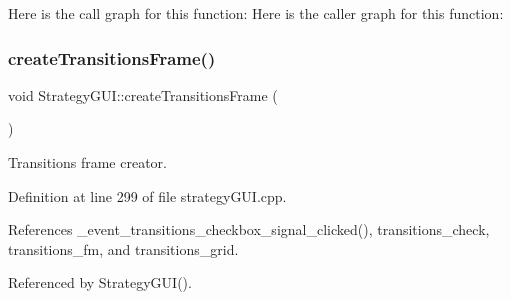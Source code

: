 Here is the call graph for this function\+:
Here is the caller graph for this function\+:
\mbox{\label{class_strategy_g_u_i_ab39aceb2dc4fc8b0b571d9284c463b5a}} 
\subsubsection{\texorpdfstring{create\+Transitions\+Frame()}{createTransitionsFrame()}}
{\footnotesize\ttfamily void Strategy\+G\+U\+I\+::create\+Transitions\+Frame (\begin{DoxyParamCaption}{ }\end{DoxyParamCaption})}



Transitions frame creator. 



Definition at line 299 of file strategy\+G\+U\+I.\+cpp.



References \+\_\+event\+\_\+transitions\+\_\+checkbox\+\_\+signal\+\_\+clicked(), transitions\+\_\+check, transitions\+\_\+fm, and transitions\+\_\+grid.



Referenced by Strategy\+G\+U\+I().


